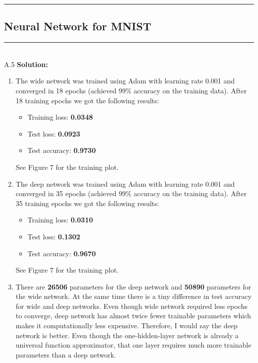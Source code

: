 \documentclass{article}
\newcommand{\1}{\mathbf{1}}
\begin{document}
\noindent\rule{\textwidth}{1pt}

\subsection*{Neural Network for MNIST}
\noindent\rule{\textwidth}{1pt}
\\
A.5 {\bf Solution:}\\
\begin{enumerate}
    \item The wide network was trained using Adam with learning rate 0.001 and converged in 18 epochs (achieved 99\% accuracy on the training data). After 18 training epochs we got the following results:
    \begin{itemize}
        \item Training loss: {\bf 0.0348}
        \item Test loss: {\bf 0.0923}
        \item Test accuracy: {\bf 0.9730}
    \end{itemize}
    See Figure 7 for the training plot. 
    
    \item The deep network was trained using Adam with learning rate 0.001 and converged in 35 epochs (achieved 99\% accuracy on the training data). After 35 training epochs we got the following results:
    \begin{itemize}
        \item Training loss: {\bf 0.0310}
        \item Test loss: {\bf 0.1302}
        \item Test accuracy: {\bf 0.9670}
    \end{itemize}
    See Figure 7 for the training plot. 
    
    \item There are {\bf 26506} parameters for the deep network and {\bf 50890} parameters for the wide network. At the same time there is a tiny difference in test accuracy for wide and deep networks. Even though wide network required less epochs to converge, deep network has almost twice fewer trainable parameters which makes it computationally less expensive. Therefore, I would say the deep network is better. Even though the one-hidden-layer network is already a universal function approximator, that one layer requires much more trainable parameters than a deep network.
    

\end{enumerate}
\end{document}
